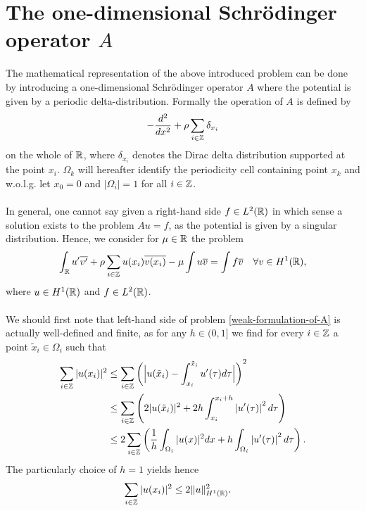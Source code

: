 \chapter{The one-dimensional Schrödinger operator $A$}

The mathematical representation of the above introduced problem can be done by introducing a one-dimensional Schrödinger operator $A$ where the potential is given by a periodic delta-distribution. Formally the operation of $A$ is defined by
\begin{equation}
	- \frac{d^{2}}{dx^{2}} + \rho \sum_{i \in \mathbb{Z}} \delta_{x_{i}} \label{the-operator-A-formally}
\end{equation}
on the whole of $\mathbb{R}$, where $\delta_{x_{i}}$ denotes the Dirac delta distribution supported at the point $x_{i}$. $\Omega_{k}$ will hereafter identify the periodicity cell containing point $x_{k}$ and w.o.l.g. let $x_{0} = 0$ and $|\Omega_{i}| = 1$ for all $i \in \mathbb{Z}$.
~\\ ~\\  
In general, one cannot say given a right-hand side $f \in L^{2}(\mathbb{R})$ in which sense a solution exists to the problem $Au = f$, as the potential is given by a singular distribution. Hence, we consider for $\mu \in \mathbb{R}$ the problem
\begin{equation}
	\int_{\mathbb{R}} u' \overline{v'} + \rho \sum_{i \in \mathbb{Z}} u(x_{i}) \overline{v(x_{i})} - \mu \int u \overline{v} = \int f \overline{v} \quad \forall v \in H^{1}(\mathbb{R}), \label{weak-formulation-of-A}
\end{equation}	
where $u \in H^{1}(\mathbb{R})$ and $f \in L^{2}(\mathbb{R})$. 
~\\ ~\\
We should first note that left-hand side of problem \eqref{weak-formulation-of-A} is actually well-defined and finite, as for any $h \in (0, 1]$ we find for every $i \in \mathbb{Z}$ a point $\tilde{x}_{i} \in \Omega_{i}$ such that
\begin{align}
	\sum_{i \in \mathbb{Z}} |u(x_{i})|^{2} & \leq \sum_{i \in \mathbb{Z}} \left( \Big| u(\tilde{x}_{i}) - \int_{x_{i}}^{\tilde{x}_{i}} u'( \tau ) d\tau \Big| \right)^{2} \notag \\
		 & \leq \sum_{i \in \mathbb{Z}} \left( 2 |u( \tilde{x}_{i} )|^{2} +  2 h \int_{x_{i}}^{x_{i} + h} \left| u'(\tau) \right|^{2} d\tau \right) \notag \\
		 & \leq 2 \sum_{i \in \mathbb{Z}} \left( \frac{1}{h} \int_{\Omega_{i}} |u( x )|^{2} dx + h \int_{\Omega_{i}} \left| u'(\tau) \right|^{2} d\tau \right). \label{preestimation-for-potential}
\end{align}
The particularly choice of $h = 1$ yields hence
\begin{align} 
		\sum_{i \in \mathbb{Z}} |u(x_{i})|^{2} & \leq 2 \| u \|^{2}_{H^{1}(\mathbb{R})}. \label{estimation-for-potential}
\end{align}

